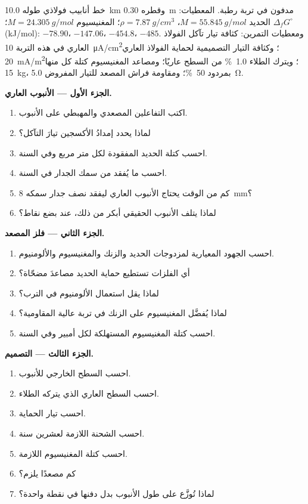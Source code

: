 \begin{problem}
\label{pb:b2:corrosion:1}
خط أنابيب فولاذي طوله \qty{10.0}{km} وقطره \qty{0.30}{m} مدفون في
تربة رطبة. المعطيات: الحديد $M = \qty{55.845}{g/mol}$، $\rho = \qty{7.87}{g/cm^3}$؛
المغنيسيوم $M = \qty{24.305}{g/mol}$؛ $\Delta_f G^\circ$ (\unit{kJ/mol}): 
$-78.90$،  $-147.06$،  $-454.8$،  $-485$. ومعطيات
التمرين: كثافة تيار تآكل الفولاذ العاري في هذه التربة \qty{10}{\micro A/cm^2}؛ وكثافة التيار
التصميمية لحماية الفولاذ العاري \qty{20}{mA/m^2}؛ ويترك الطلاء 1.0~\% من السطح عاريًا؛
ومصاعد المغنيسيوم كتلة كل منها \qty{15}{kg}، بمردود 50~\%؛ ومقاومة فراش المصعد للتيار
المفروض \qty{5.0}{\ohm}.

\medskip
\noindent\textbf{الجزء الأول --- الأنبوب العاري.}
\begin{enumerate}
  \item اكتب التفاعلين المصعدي والمهبطي على الأنبوب.
  \item لماذا يحدد إمدادُ الأكسجين تيارَ التآكل؟
  \item احسب كتلة الحديد المفقودة لكل متر مربع وفي السنة.
  \item احسب ما يُفقد من سمك الجدار في السنة.
  \item كم من الوقت يحتاج الأنبوب العاري ليفقد نصف جدار سمكه \qty{8}{mm}؟
  \item لماذا يتلف الأنبوب الحقيقي أبكر من ذلك، عند بضع نقاط؟
\end{enumerate}

\medskip
\noindent\textbf{الجزء الثاني --- فلز المصعد.}
\begin{enumerate}[resume]
  \item احسب الجهود المعيارية لمزدوجات الحديد والزنك والمغنيسيوم
        والألومنيوم.
  \item أي الفلزات تستطيع حماية الحديد مصاعدَ مضحّاة؟
  \item لماذا يقل استعمال الألومنيوم في الترب؟
  \item لماذا يُفضَّل المغنيسيوم على الزنك في تربة عالية المقاومية؟
  \item احسب كتلة المغنيسيوم المستهلكة لكل أمبير وفي السنة.
\end{enumerate}

\medskip
\noindent\textbf{الجزء الثالث --- التصميم.}
\begin{enumerate}[resume]
  \item احسب السطح الخارجي للأنبوب.
  \item احسب السطح العاري الذي يتركه الطلاء.
  \item احسب تيار الحماية.
  \item احسب الشحنة اللازمة لعشرين سنة.
  \item احسب كتلة المغنيسيوم اللازمة.
  \item كم مصعدًا يلزم؟
  \item لماذا تُوزَّع على طول الأنبوب بدل دفنها في
        نقطة واحدة؟
\end{enumerate}


\end{problem}
